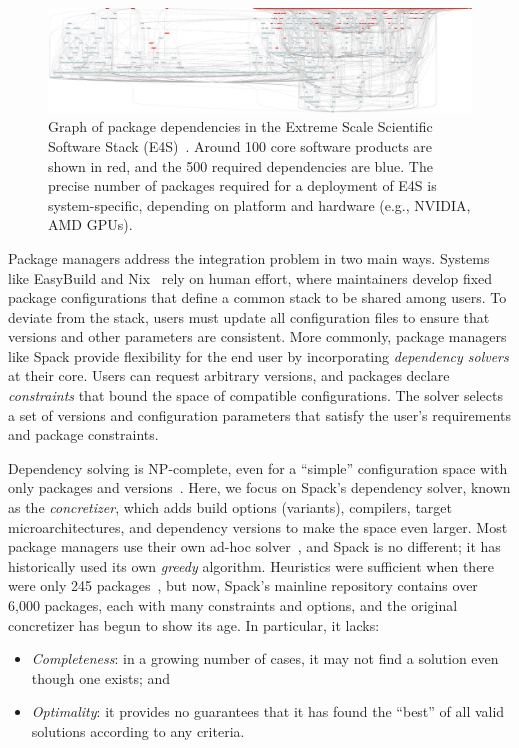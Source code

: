 \begin{figure}
  \centering
  \includegraphics[width=\textwidth]{figures/e4s.pdf}
  \caption{
    Graph of package dependencies in the Extreme Scale Scientific Software Stack (E4S)~\cite{e4s}.
    Around 100 core software products are shown in red, and the 500 required dependencies
    are blue. The precise number of packages required for a deployment of E4S
    is system-specific, depending on platform and hardware (e.g., NVIDIA, AMD GPUs).
    \label{fig:e4s-graph}
  }
\end{figure}

Package managers address the integration problem in two main ways. Systems like
EasyBuild and Nix~\cite{dolstra+:icfp08,dolstra+:lisa04} rely on human effort, where
maintainers develop fixed package configurations that define a common stack to be
shared among users. To deviate from the stack, users must update all configuration files
to ensure that versions and other parameters are consistent. More commonly, package
managers like Spack provide flexibility for the end user by incorporating {\it
  dependency solvers} at their core. Users can request arbitrary versions, and packages
declare {\it constraints} that bound the space of compatible configurations. The solver
selects a set of versions and configuration parameters that satisfy the user's
requirements and package constraints.

Dependency solving is NP-complete, even for a ``simple'' configuration space with only
packages and versions~\cite{dicosmo:edos,cox:version-sat}. Here, we focus on Spack's
dependency solver, known as the {\it concretizer}, which adds build options (variants),
compilers, target microarchitectures, and dependency versions to make the space even
larger. Most package managers use their own ad-hoc solver~\cite{abate2020dependency},
and Spack is no different; it has historically used its own {\it greedy} algorithm.
Heuristics were sufficient when there were only 245 packages~\cite{gamblin+:sc15}, but
now, Spack's mainline repository contains over 6,000 packages, each with many
constraints and options, and the original concretizer has begun to show its age. In
particular, it lacks:
\begin{itemize}
\item {\it Completeness}: in a growing number of cases, it may not find a solution even
  though one exists; and
\item {\it Optimality}: it provides no guarantees that it has found the ``best''
  of all valid solutions according to any criteria.
\end{itemize}

